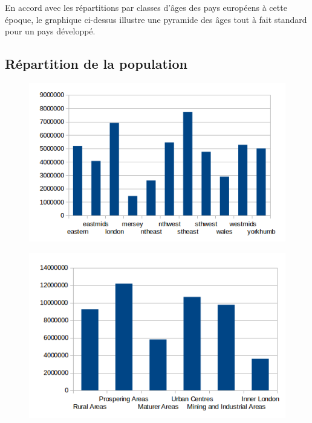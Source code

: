 En accord avec les répartitions par classes d'âges des pays européens à cette époque, le graphique ci-dessus illustre une pyramide des âges tout à fait standard pour un pays développé.
\pagebreak


\subsection{Répartition de la population}

\begin{figure}[h!]
    \centering
    \includegraphics[width=\linewidth]{images/pop/popRegion.png}
\end{figure}

\begin{figure}[h!]
    \centering
    \includegraphics[width=\linewidth]{images/pop/popCluster.png}
\end{figure}

